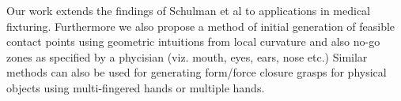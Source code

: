 
Our work extends the findings of Schulman et al\cite{schulman2011grasping}
to applications in medical fixturing. Furthermore we also propose a method of 
initial generation of feasible contact points using geometric intuitions from 
local curvature and also no-go zones as specified by a phycisian (viz. mouth, eyes,
ears, nose etc.) Similar methods can also be used for generating form/force
closure grasps for physical objects using multi-fingered hands or multiple hands. 


